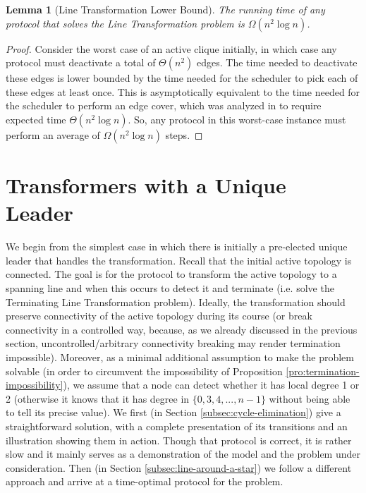 \documentclass[preprint]{elsarticle}
\newtheorem{lemma}{Lemma}
\begin{document}
\begin{lemma} [Line Transformation Lower Bound] \label{lem:line-lower-bound}
The running time of any protocol that solves the Line Transformation problem is $\Omega(n^2\log n)$.
\end{lemma}
\begin{proof} 
Consider the worst case of an active clique initially, in which case any protocol must deactivate a total of $\Theta(n^2)$ edges. The time needed to deactivate these edges is lower bounded by the time needed for the scheduler to pick each of these edges at least once. This is asymptotically equivalent to the time needed for the scheduler to perform an edge cover, which was analyzed in \cite{MS14} to require expected time $\Theta(n^2\log n)$. So, any protocol in this worst-case instance must perform an average of $\Omega(n^2\log n)$ steps.  
\end{proof}

\section{Transformers with a Unique Leader}
\label{sec:unique-leader}

We begin from the simplest case in which there is initially a pre-elected unique leader that handles the transformation. Recall that the initial active topology is connected. The goal is for the protocol to transform the active topology to a spanning line and when this occurs to detect it and terminate (i.e. solve the Terminating Line Transformation problem). Ideally, the transformation should preserve connectivity of the active topology during its course (or break connectivity in a controlled way, because, as we already discussed in the previous section, uncontrolled/arbitrary connectivity breaking may render termination impossible). Moreover, as a minimal additional assumption to make the problem solvable (in order to circumvent the impossibility of Proposition \ref{pro:termination-impossibility}), we assume that a node can detect whether it has local degree 1 or 2 (otherwise it knows that it has degree in $\{0,3,4,...,n-1\}$ without being able to tell its precise value). We first (in Section \ref{subsec:cycle-elimination}) give a straightforward solution, with a complete presentation of its transitions and an illustration showing them in action. Though that protocol is correct, it is rather slow and it mainly serves as a demonstration of the model and the problem under consideration. Then (in Section \ref{subsec:line-around-a-star}) we follow a different approach and arrive at a time-optimal protocol for the problem.
\end{document}
